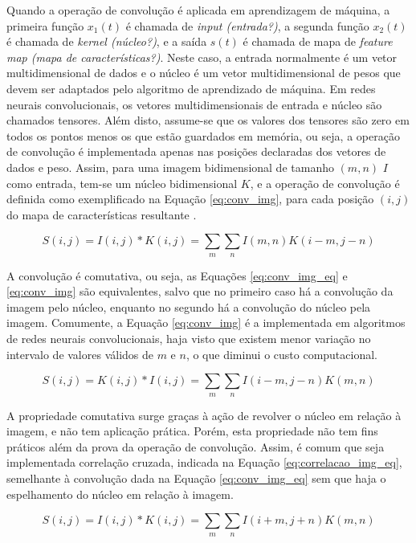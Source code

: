 Quando a operação de convolução é aplicada em aprendizagem de máquina, a primeira função $x_1(t)$ é chamada de \emph{input (entrada?)}, a segunda função $x_2(t)$ é chamada de \emph{kernel (núcleo?)}, e a saída $s(t)$ é chamada de mapa de \emph{feature map (mapa de características?)}. Neste caso, a entrada normalmente é um vetor multidimensional de dados e o núcleo é um vetor multidimensional de pesos que devem ser adaptados pelo algoritmo de aprendizado de máquina. Em redes neurais convolucionais, os vetores multidimensionais de entrada e núcleo são chamados tensores. Além disto, assume-se que os valores dos tensores são zero em todos os pontos menos os que estão guardados em memória, ou seja, a operação de convolução é implementada apenas nas posições declaradas dos vetores de dados e peso. Assim, para uma imagem bidimensional de tamanho $(m,n)$ $I$ como entrada, tem-se um núcleo bidimensional $K$, e a operação de convolução é definida como exemplificado na Equação \ref{eq:conv_img}, para cada posição $(i,j)$ do mapa de características resultante \cite{goodfellow2016deep}.

\begin{equation}\label{eq:conv_img}
	S(i,j) = I(i,j)*K(i,j) = \sum_{m}\sum_{n}I(m,n)K(i-m,j-n)
\end{equation}

A convolução é comutativa, ou seja, as Equações \ref{eq:conv_img_eq} e \ref{eq:conv_img} são equivalentes, salvo que no primeiro caso há a convolução da imagem pelo núcleo, enquanto no segundo há a convolução do núcleo pela imagem. Comumente, a Equação \ref{eq:conv_img} é a implementada em algoritmos de redes neurais convolucionais, haja visto que existem menor variação no intervalo de valores válidos de $m$ e $n$, o que diminui o custo computacional.

\begin{equation}\label{eq:conv_img_eq}
	S(i,j) = K(i,j)*I(i,j) = \sum_{m}\sum_{n}I(i-m,j-n)K(m,n)
\end{equation}

A propriedade comutativa surge graças à ação de revolver o núcleo em relação à imagem, e não tem aplicação prática. Porém, esta propriedade não tem fins práticos além da prova da operação de convolução. Assim, é comum que seja implementada correlação cruzada, indicada na Equação \ref{eq:correlacao_img_eq}, semelhante à convolução dada na Equação \ref{eq:conv_img_eq} sem que haja o espelhamento do núcleo em relação à imagem.

\begin{equation}\label{eq:correlacao_img_eq}
	S(i,j) = I(i,j)*K(i,j) = \sum_{m}\sum_{n}I(i+m,j+n)K(m,n)
\end{equation}

